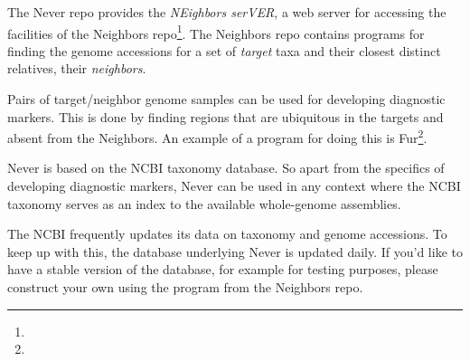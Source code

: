 The Never repo provides the \emph{NEighbors serVER}, a web server for
accessing the facilities of the Neighbors
repo\footnote{}. The Neighbors
repo contains programs for finding the genome accessions for a set of
\emph{target} taxa and their closest distinct relatives, their
\emph{neighbors}.

Pairs of target/neighbor genome samples can be used for developing
diagnostic markers. This is done by finding regions that are
ubiquitous in the targets and absent from the Neighbors. An example of
a program for doing this is
Fur\footnote{}.

Never is based on the NCBI taxonomy database. So apart from the
specifics of developing diagnostic markers, Never can be used in any
context where the NCBI taxonomy serves as an index to the available
whole-genome assemblies.

The NCBI frequently updates its data on taxonomy and genome
accessions. To keep up with this, the database underlying Never is
updated daily. If you'd like to have a stable version of the database,
for example for testing purposes, please construct your own using the
program  from the Neighbors repo.
